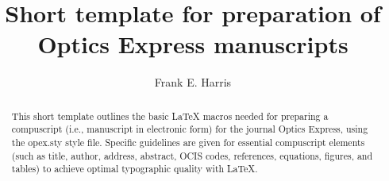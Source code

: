 

\title{Short template for preparation of \\
Optics Express manuscripts}

\author{Frank E. Harris}
\address{Optical Society of America, Washington, DC 20036-1023 USA}

\begin{abstract}%
This short template outlines the basic LaTeX macros 
needed for preparing a compuscript 
(i.e., manuscript in electronic form) for the journal 
Optics Express, using the opex.sty style file.  
Specific guidelines are given for essential 
compuscript elements (such as title, author, address, 
abstract, OCIS codes, references, equations, 
figures, and  tables) to achieve 
optimal typographic quality with LaTeX.
\end{abstract}

